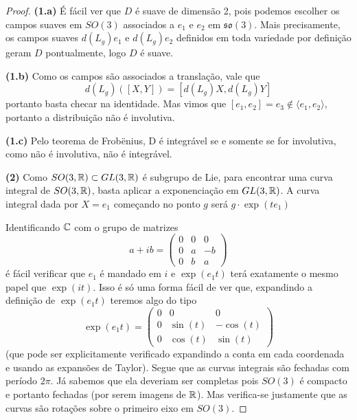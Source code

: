 \begin{exercise}
    \label{prob:l3:6}
\end{exercise}
\begin{proof}
    \textbf{(1.a)} É fácil ver que $D$ é suave de dimensão 2, pois podemos escolher 
    os campos suaves em $SO(3)$ associados a $e_1$ e $e_2$ em $\mathfrak{so}(3)$.
    Mais precisamente, os campos suaves $d(L_g)e_1$ e $d(L_g)e_2$ definidos em toda variedade por 
    definição geram $D$ pontualmente, logo $D$ é suave.

    \textbf{(1.b)} Como os campos são associados a translação, vale que 
    $$d(L_g)([X,Y]) = [d(L_g)X, d(L_g)Y]$$
    portanto basta checar na identidade. Mas vimos que $[e_1, e_2] = e_3 \not \in \langle e_1, e_2 \rangle$,
    portanto a distribuição não é involutiva.

    \textbf{(1.c)} Pelo teorema de Frobënius, D é integrável se e somente se for involutiva, como não é 
    involutiva, não é integrável.

    \textbf{(2)} Como $SO(3,\mathbb{R}) \subset GL(3,\mathbb{R})$ é subgrupo de Lie, para encontrar uma curva integral de $SO(3,\mathbb{R})$, basta aplicar a exponenciação
    em $GL(3,\mathbb{R})$. A curva integral dada por $X = e_1$ começando no ponto $g$ será $g \cdot \exp(t e_1)$
    
    Identificando $\mathbb{C}$ com o grupo de matrizes 
    $$a + ib = \begin{pmatrix}
        0 & 0 & 0 \\
        0 & a & -b\\
        0 & b & a
    \end{pmatrix}$$
    é fácil verificar que $e_1$ é mandado em $i$ e $\exp(e_1t)$ terá exatamente o mesmo papel 
    que $\exp(it)$. Isso é só uma forma fácil de ver que, expandindo a definição de $\exp(e_1 t)$
    teremos algo do tipo
    $$\exp(e_1 t) = \begin{pmatrix}
        0 & 0 & 0 \\
        0 & \sin(t) & -\cos(t) \\
        0 & \cos(t) & \sin(t)
    \end{pmatrix}$$
    (que pode ser explicitamente verificado expandindo a conta em cada coordenada e usando as expansões de Taylor).
    Segue que as curvas integrais são fechadas com período $2\pi$. Já sabemos que ela deveriam ser completas pois $SO(3)$ é compacto
    e portanto fechadas (por serem imagens de $\mathbb{R}$). Mas verifica-se justamente que as curvas são rotações sobre o primeiro eixo em $SO(3)$. 
\end{proof}



